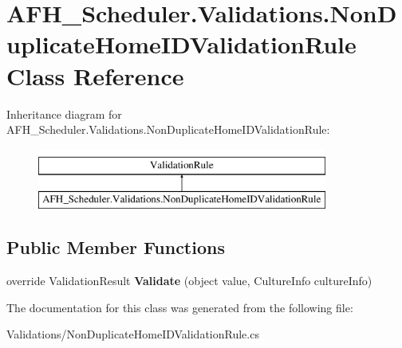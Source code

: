 \section{A\+F\+H\+\_\+\+Scheduler.\+Validations.\+Non\+Duplicate\+Home\+I\+D\+Validation\+Rule Class Reference}
\label{class_a_f_h___scheduler_1_1_validations_1_1_non_duplicate_home_i_d_validation_rule}
Inheritance diagram for A\+F\+H\+\_\+\+Scheduler.\+Validations.\+Non\+Duplicate\+Home\+I\+D\+Validation\+Rule\+:\begin{figure}[H]
\begin{center}
\leavevmode
\includegraphics[height=2.000000cm]{class_a_f_h___scheduler_1_1_validations_1_1_non_duplicate_home_i_d_validation_rule}
\end{center}
\end{figure}
\subsection*{Public Member Functions}
\begin{DoxyCompactItemize}
\item 
\mbox{\label{class_a_f_h___scheduler_1_1_validations_1_1_non_duplicate_home_i_d_validation_rule_a86993a7c694f90fc22cd2029520053ad}} 
override Validation\+Result {\bfseries Validate} (object value, Culture\+Info culture\+Info)
\end{DoxyCompactItemize}


The documentation for this class was generated from the following file\+:\begin{DoxyCompactItemize}
\item 
Validations/Non\+Duplicate\+Home\+I\+D\+Validation\+Rule.\+cs\end{DoxyCompactItemize}
